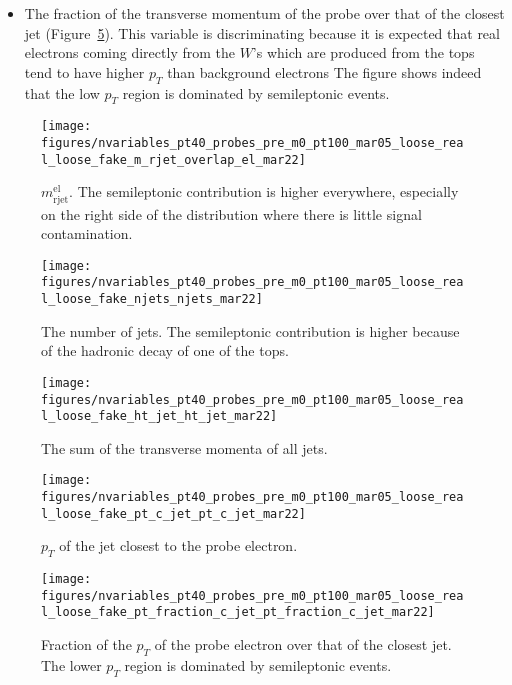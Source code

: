 \begin{itemize}[label=]
	\item The fraction of the transverse momentum of the probe over that of the
	      closest jet (Figure~\ref{f:preptfractioncjet}). This variable is discriminating
	      because it is expected that real electrons coming directly from the $W$'s which
	      are produced from the tops tend to have higher $p_T$ than background electrons
	      The figure shows indeed that the low $p_T$ region is dominated by semileptonic
	      events.

\end{itemize}

\begin{figure}[H]
	\texttt{[image: figures/nvariables\_pt40\_probes\_pre\_m0\_pt100\_mar05\_loose\_real\_loose\_fake\_m\_rjet\_overlap\_el\_mar22]}
	\centering
	\caption{$m_{\text{rjet}}^{\text{el}}$. The semileptonic contribution is higher everywhere, especially on the right side of the distribution where
		there is little signal contamination.}
	\label{f:premrjet}
\end{figure}

\begin{figure}[H]
	\texttt{[image: figures/nvariables\_pt40\_probes\_pre\_m0\_pt100\_mar05\_loose\_real\_loose\_fake\_njets\_njets\_mar22]}
	\centering
	\caption{The number of jets. The semileptonic contribution is higher because of the hadronic decay of one of the tops.}
	\label{f:prenjets}
\end{figure}

\begin{figure}[H]
	\texttt{[image: figures/nvariables\_pt40\_probes\_pre\_m0\_pt100\_mar05\_loose\_real\_loose\_fake\_ht\_jet\_ht\_jet\_mar22]}
	\centering
	\caption{The sum of the transverse momenta of all jets.}
	\label{f:prehtjet}
\end{figure}


\begin{figure}[H]
	\texttt{[image: figures/nvariables\_pt40\_probes\_pre\_m0\_pt100\_mar05\_loose\_real\_loose\_fake\_pt\_c\_jet\_pt\_c\_jet\_mar22]}
	\centering
	\caption{$p_T$ of the jet closest to the probe electron. }
	\label{f:preptcjet}
\end{figure}


\begin{figure}[H]
	\texttt{[image: figures/nvariables\_pt40\_probes\_pre\_m0\_pt100\_mar05\_loose\_real\_loose\_fake\_pt\_fraction\_c\_jet\_pt\_fraction\_c\_jet\_mar22]}
	\centering
	\caption{Fraction of the $p_T$ of the probe electron over that of the closest jet. The lower $p_T$ region is dominated by semileptonic events.}
	\label{f:preptfractioncjet}
\end{figure}

